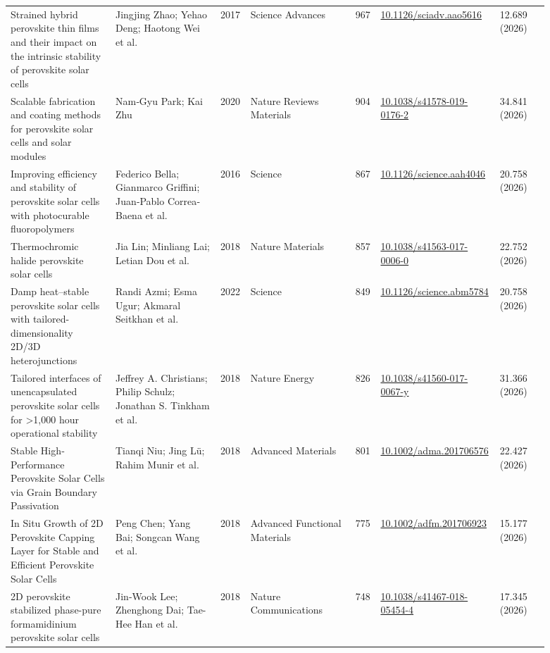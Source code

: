\documentclass[10pt,a4paper]{article}
\begin{document}
{\begin{longtable}{p{0.197\linewidth}p{0.197\linewidth}p{0.043\linewidth}p{0.197\linewidth}p{0.043\linewidth}p{0.117\linewidth}p{0.098\linewidth}}
Strained hybrid perovskite thin films and their impact on the intrinsic stability of perovskite solar cells & Jingjing Zhao; Yehao Deng; Haotong Wei et al. & 2017 & Science Advances & 967 & \href{https://doi.org/10.1126/sciadv.aao5616}{10.1126/sciadv.aao5616} & 12.689 (2026) \\
Scalable fabrication and coating methods for perovskite solar cells and solar modules & Nam‐Gyu Park; Kai Zhu & 2020 & Nature Reviews Materials & 904 & \href{https://doi.org/10.1038/s41578-019-0176-2}{10.1038/s41578-019-0176-2} & 34.841 (2026) \\
Improving efficiency and stability of perovskite solar cells with photocurable fluoropolymers & Federico Bella; Gianmarco Griffini; Juan‐Pablo Correa‐Baena et al. & 2016 & Science & 867 & \href{https://doi.org/10.1126/science.aah4046}{10.1126/science.aah4046} & 20.758 (2026) \\
Thermochromic halide perovskite solar cells & Jia Lin; Minliang Lai; Letian Dou et al. & 2018 & Nature Materials & 857 & \href{https://doi.org/10.1038/s41563-017-0006-0}{10.1038/s41563-017-0006-0} & 22.752 (2026) \\
Damp heat–stable perovskite solar cells with tailored-dimensionality 2D/3D heterojunctions & Randi Azmi; Esma Ugur; Akmaral Seitkhan et al. & 2022 & Science & 849 & \href{https://doi.org/10.1126/science.abm5784}{10.1126/science.abm5784} & 20.758 (2026) \\
Tailored interfaces of unencapsulated perovskite solar cells for >1,000 hour operational stability & Jeffrey A. Christians; Philip Schulz; Jonathan S. Tinkham et al. & 2018 & Nature Energy & 826 & \href{https://doi.org/10.1038/s41560-017-0067-y}{10.1038/s41560-017-0067-y} & 31.366 (2026) \\
Stable High‐Performance Perovskite Solar Cells via Grain Boundary Passivation & Tianqi Niu; Jing Lü; Rahim Munir et al. & 2018 & Advanced Materials & 801 & \href{https://doi.org/10.1002/adma.201706576}{10.1002/adma.201706576} & 22.427 (2026) \\
In Situ Growth of 2D Perovskite Capping Layer for Stable and Efficient Perovskite Solar Cells & Peng Chen; Yang Bai; Songcan Wang et al. & 2018 & Advanced Functional Materials & 775 & \href{https://doi.org/10.1002/adfm.201706923}{10.1002/adfm.201706923} & 15.177 (2026) \\
2D perovskite stabilized phase-pure formamidinium perovskite solar cells & Jin‐Wook Lee; Zhenghong Dai; Tae-Hee Han et al. & 2018 & Nature Communications & 748 & \href{https://doi.org/10.1038/s41467-018-05454-4}{10.1038/s41467-018-05454-4} & 17.345 (2026) \\

\end{longtable}}
\end{document}
